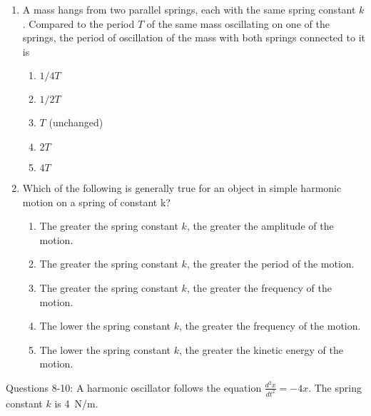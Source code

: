 \documentclass[12pt]{article}
\begin{document}
\begin{enumerate}[leftmargin=50pt,label=\underline{\hspace{0.4in}} \arabic*.]
\item\vspace{-.2in} A mass hangs from two parallel springs, each with the same spring
  constant $k$. Compared to the period $T$ of the same mass oscillating on
  one of the springs, the period of oscillation of the mass with both
  springs connected to it is
  \begin{enumerate}[noitemsep,topsep=0pt]
  \item $1/4T$
  \item $1/2T$
  \item $T$ (unchanged)
  \item $2T$
  \item $4T$
  \end{enumerate}

\item Which of the following is generally true for an object in simple
  harmonic motion on a spring of constant k?
  \begin{enumerate}[noitemsep,topsep=0pt]
  \item The greater the spring constant $k$, the greater the amplitude of the
    motion.
  \item The greater the spring constant $k$, the greater the period of the
    motion.
  \item The greater the spring constant $k$, the greater the frequency of the
    motion.
  \item The lower the spring constant $k$, the greater the frequency of the
    motion.
  \item The lower the spring constant $k$, the greater the kinetic energy of
    the motion.
  \end{enumerate}
\end{enumerate}

\noindent Questions 8-10: A harmonic oscillator follows the equation
$\displaystyle\frac{d^2x}{dt^2}=-4x$. The spring constant $k$ is \SI{4}{N/m}.
\end{document}
